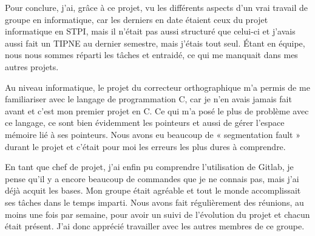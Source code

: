 	Pour conclure, j’ai, grâce à ce projet, vu les différents aspects d’un vrai travail de groupe en informatique, car les derniers en date étaient ceux du projet informatique en STPI, mais il n’était pas aussi structuré que celui-ci et j’avais aussi fait un TIPNE au dernier semestre, mais j’étais tout seul.
Étant en équipe, nous nous sommes réparti les tâches et entraidé, ce qui me manquait dans mes autres projets.


	Au niveau informatique, le projet du correcteur orthographique m’a permis de me familiariser avec le langage de programmation C, car je n’en avais jamais fait avant et c’est mon premier projet en C. Ce qui m’a posé le plus de problème avec ce langage, ce sont bien évidemment les pointeurs et aussi de gérer l’espace mémoire lié à ses pointeurs. Nous avons eu beaucoup de « segmentation fault » durant le projet et c’était pour moi les erreurs les plus dures à comprendre.


	En tant que chef de projet, j’ai enfin pu comprendre l’utilisation de Gitlab, je pense qu’il y a encore beaucoup de commandes que je ne connais pas, mais j’ai déjà acquit les bases. Mon groupe était agréable et tout le monde accomplissait ses tâches dans le temps imparti. Nous avons fait régulièrement des réunions, au moins une fois par semaine, pour avoir un suivi de l’évolution du projet et chacun était présent. J’ai donc apprécié travailler avec les autres membres de ce groupe.